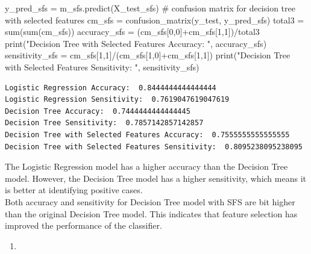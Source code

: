 \documentclass[
  11pt,
  letterpaper,
  DIV=11,
  numbers=noendperiod]{scrartcl}
\newenvironment{Shaded}{\begin{snugshade}}{\end{snugshade}}
\newcommand{\BuiltInTok}[1]{\textcolor[rgb]{0.00,0.23,0.31}{#1}}
\newcommand{\CommentTok}[1]{\textcolor[rgb]{0.37,0.37,0.37}{#1}}
\newcommand{\DecValTok}[1]{\textcolor[rgb]{0.68,0.00,0.00}{#1}}
\newcommand{\NormalTok}[1]{\textcolor[rgb]{0.00,0.23,0.31}{#1}}
\newcommand{\OperatorTok}[1]{\textcolor[rgb]{0.37,0.37,0.37}{#1}}
\newcommand{\StringTok}[1]{\textcolor[rgb]{0.13,0.47,0.30}{#1}}
\providecommand{\tightlist}{%
  \setlength{\itemsep}{0pt}\setlength{\parskip}{0pt}}\usepackage{longtable,booktabs,array}
\begin{document}
\begin{Shaded}
\begin{Highlighting}[]
\NormalTok{y\_pred\_sfs }\OperatorTok{=}\NormalTok{ m\_sfs.predict(X\_test\_sfs)}
\CommentTok{\# confusion matrix for decision tree with selected features}
\NormalTok{cm\_sfs }\OperatorTok{=}\NormalTok{ confusion\_matrix(y\_test, y\_pred\_sfs)}
\NormalTok{total3 }\OperatorTok{=} \BuiltInTok{sum}\NormalTok{(}\BuiltInTok{sum}\NormalTok{(cm\_sfs))}
\NormalTok{accuracy\_sfs }\OperatorTok{=}\NormalTok{ (cm\_sfs[}\DecValTok{0}\NormalTok{,}\DecValTok{0}\NormalTok{]}\OperatorTok{+}\NormalTok{cm\_sfs[}\DecValTok{1}\NormalTok{,}\DecValTok{1}\NormalTok{])}\OperatorTok{/}\NormalTok{total3}
\BuiltInTok{print}\NormalTok{(}\StringTok{"Decision Tree with Selected Features Accuracy: "}\NormalTok{, accuracy\_sfs)}
\NormalTok{sensitivity\_sfs }\OperatorTok{=}\NormalTok{ cm\_sfs[}\DecValTok{1}\NormalTok{,}\DecValTok{1}\NormalTok{]}\OperatorTok{/}\NormalTok{(cm\_sfs[}\DecValTok{1}\NormalTok{,}\DecValTok{0}\NormalTok{]}\OperatorTok{+}\NormalTok{cm\_sfs[}\DecValTok{1}\NormalTok{,}\DecValTok{1}\NormalTok{])}
\BuiltInTok{print}\NormalTok{(}\StringTok{"Decision Tree with Selected Features Sensitivity: "}\NormalTok{, sensitivity\_sfs)}
\end{Highlighting}
\end{Shaded}

\begin{verbatim}
Logistic Regression Accuracy:  0.8444444444444444
Logistic Regression Sensitivity:  0.7619047619047619
Decision Tree Accuracy:  0.7444444444444445
Decision Tree Sensitivity:  0.7857142857142857
Decision Tree with Selected Features Accuracy:  0.7555555555555555
Decision Tree with Selected Features Sensitivity:  0.8095238095238095
\end{verbatim}

The Logistic Regression model has a higher accuracy than the Decision
Tree model. However, the Decision Tree model has a higher sensitivity,
which means it is better at identifying positive cases.\\
Both accuracy and sensitivity for Decision Tree model with SFS are bit
higher than the original Decision Tree model. This indicates that
feature selection has improved the performance of the classifier.

\begin{enumerate}
\def\labelenumi{(\arabic{enumi})}
\setcounter{enumi}{13}
\tightlist
\item
\end{enumerate}
\end{document}
